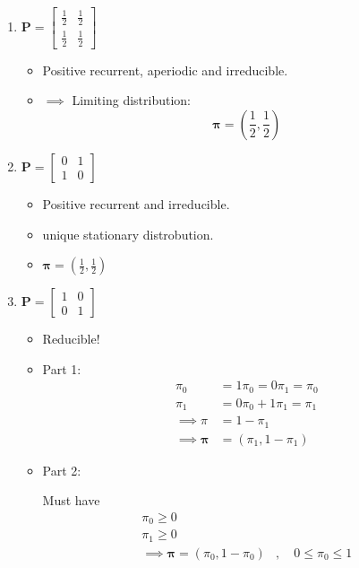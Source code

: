 \documentclass{article}
\theoremstyle{remark}
\newcommand{\newpara}
  {
  \vskip 0.4cm
  }
\begin{document}
\begin{enumerate}[label=(\roman*)]
  \item $\mathbf{P } = \begin{bmatrix}
  \frac{1}{2}  &  \frac{1}{2} \\
  \frac{1}{2}  &  \frac{1}{2}
  \end{bmatrix}
  $

  \newpara
  \begin{itemize}
    \item
  Positive recurrent, aperiodic  and irreducible.
\item
  $\implies $ Limiting distribution: \[
  \mathbf{\pi } = \left( \frac{1}{2}, \frac{1}{2} \right)
  \]
  \end{itemize}
\item $\mathbf{P} = \begin{bmatrix}
0  &  1 \\
1  &  0
\end{bmatrix}
$
\begin{itemize}
  \item Positive recurrent and irreducible.
  \item unique stationary distrobution.
  \item $\mathbf{\pi } = \left( \frac{1}{2} , \frac{1}{2} \right)$
\end{itemize}

\item $\mathbf{P} = \begin{bmatrix}
1  &  0 \\
0  &  1
\end{bmatrix}
$

\begin{itemize}
  \item Reducible!
  \item Part 1: \[
      \begin{split}
  \pi _{0}  & = 1 \pi _{0} = 0 \pi _{1} = \pi _{0} \\
  \pi _{1}  & = 0 \pi _{0} + 1 \pi _{1} = \pi _{1} \\
  \implies  \pi _{}  & = 1 - \pi _{1} \\
  \implies  \mathbf{\pi }  & = \left( \pi _{1} , 1 - \pi _{1} \right)
      \end{split}
  \]
\item Part 2:

\newpara
Must have \[
\begin{split}
  \pi _{0} \ge 0 \\
  \pi _{1 } \ge 0 \\
  \implies  \mathbf{\pi } =  \left( \pi _{0} , 1- \pi _{0}  \right)  & , \quad 0\le \pi _{0} \le 1
\end{split}
\]
\end{itemize}
\end{enumerate}
\end{document}
